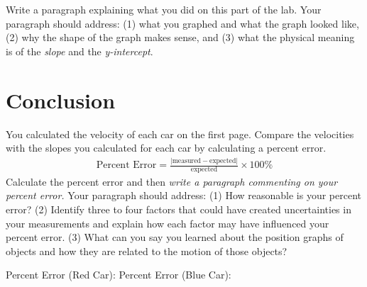 \documentclass[10pt]{exam}
\begin{document}
    \vspace{1em}


    \vspace{2em}

\noindent
Write a paragraph explaining what you did on this part of the lab.  Your paragraph should address: (1) what you graphed and what the graph looked like, (2) why the shape of the graph makes sense, and (3) what the physical meaning is of the \emph{slope} and the \emph{y-intercept}.

\pagebreak

\section*{Conclusion}

You calculated the velocity of each car on the first page.  Compare the velocities with the slopes you calculated for each car by calculating a percent error.
%
\begin{align*}
  \text{Percent Error} = \frac{\left| \text{measured} - \text{expected}  \right|}{\text{expected}} \times 100\%
\end{align*}
%
Calculate the percent error and then \emph{write a paragraph commenting on your percent error.}  Your paragraph should address: (1) How reasonable is your percent error? (2) Identify three to four factors that could have created uncertainties in your measurements and explain how each factor may have influenced your percent error. (3) What can you say you learned about the position graphs of objects and how they are related to the motion of those objects?


\vspace{1em}

Percent Error (Red Car): \fillin[][10em]
%
\hfill
%
Percent Error (Blue Car): \fillin[][10em]
\end{document}
